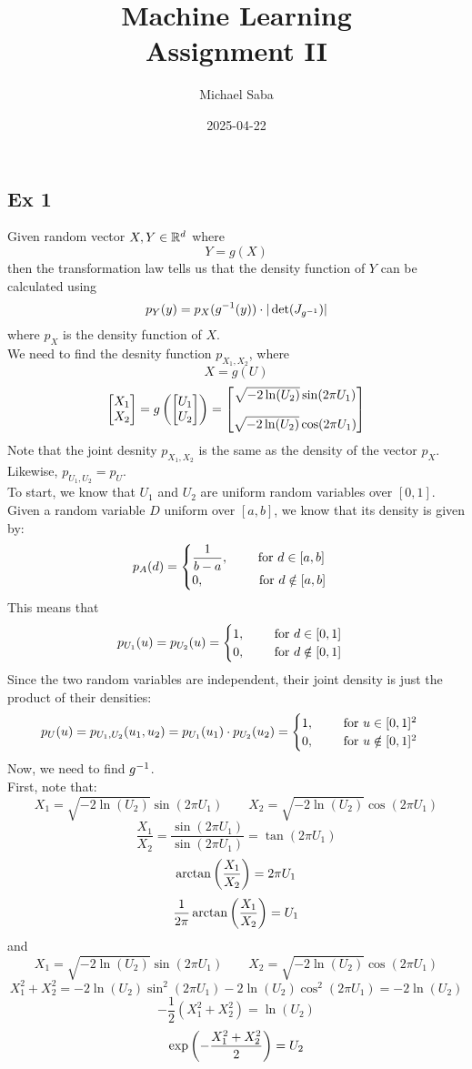 \documentclass[12pt]{article}
\title{%
    \Huge Machine Learning \\
    \Large Assignment II
}
\date{2025-04-22}
\author{Michael Saba}
\begin{document}
\maketitle
\newpage
\setlength{\parindent}{0pt}

\subsection*{Ex 1}

Given random vector $X, Y \in \mathbb{R}^d$ where
\[ Y = g(X) \]
then the transformation law tells us that
the density function of $Y$ can be calculated
using
\[ p_Y(y) = p_X(g^{-1} (y)) \cdot 
| \det(J_{g^{-1}}) | \]
where $p_X$ is the density function of $X$. \\
We need to find the desnity function $p_{X_1, X_2}$,
where
\[ X = g(U) \]
\[ \vecTwo{X_1}{X_2} = g\para{\vecTwo{U_1}{U_2}}
= \vecTwo
{\sqrt{-2\ln(U_2)}\sin(2\pi U_1) \vspace{10pt}}
{\sqrt{-2\ln(U_2)}\cos(2\pi U_1)}\]
Note that the joint desnity $p_{X_1, X_2}$
is the same as the density of the vector $p_X$.
Likewise, $p_{U_1, U_2} = p_U$. \\ 
To start, we know that $U_1$ and $U_2$
are uniform random variables over $[0, 1]$. \\
Given a random variable $D$ uniform over $[a, b]$,
we know that its density is given by:
\[ p_A(d) = \begin{cases} \dfrac{1}{b-a},
\qquad \text{ for } d \in [a, b] \\  0, \qquad \qquad \text{ for } d \notin [a, b] \end{cases} \]
This means that 
\[ p_{U_1}(u) = p_{U_2}(u) = 
\begin{cases} 1, \qquad \text{ for } d \in [0, 1] \\  0, \qquad \text{ for } d \notin [0, 1] \end{cases} \]
Since the two random variables are independent,
their joint density is just the product
of their densities:
\[ p_U(u) = p_{U_1, U_2}(u_1, u_2) =
p_{U_1}(u_1) \cdot p_{U_2}(u_2) = 
\begin{cases} 1, \qquad \text{ for } u \in [0, 1]^2 \\  0, \qquad \text{ for } u \notin [0, 1]^2 \end{cases} \]
Now, we need to find $g^{-1}$. \\
First, note that:
\[ X_1 = \sqrt{-2\ln(U_2)}\sin(2\pi U_1)
\qquad X_2 = \sqrt{-2\ln(U_2)}\cos(2\pi U_1) \]
\[ \dfrac{X_1}{X_2} = 
\dfrac{\sin(2\pi U_1)}{\sin(2\pi U_1)}
= \tan(2\pi U_1) \]
\[ \arctan\left( \dfrac{X_1}{X_2} \right) = 2\pi U_1 \]
\[ \dfrac{1}{2\pi}\arctan\left( \dfrac{X_1}{X_2} \right) 
= U_1 \]
and
\[ X_1 = \sqrt{-2\ln(U_2)}\sin(2\pi U_1)
\qquad X_2 = \sqrt{-2\ln(U_2)}\cos(2\pi U_1) \]
\[ X_1^2 + X_2^2 = 
-2\ln(U_2)\sin^2(2\pi U_1) 
-2\ln(U_2)\cos^2(2\pi U_1)
= -2\ln(U_2) \]
\[ -\dfrac{1}{2}(X_1^2 + X_2^2) = \ln(U_2) \]
\[ \exp\left( -\dfrac{X_1^2 + X_2^2}{2} \right) = U_2 \]
\end{document}
